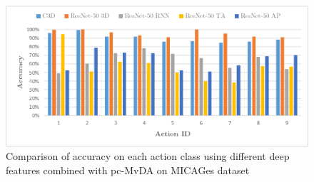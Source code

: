     \begin{figure}[htbp]
        \centering
        \includegraphics[width=0.8\linewidth]{figs/pc-MvDA_confusion_mica.png}
        \caption{Comparison of accuracy on each action class using different deep features combined with pc-MvDA on MICAGes dataset}
        \label{fig:pc-MvDA_confusion_mica}
    \end{figure}
